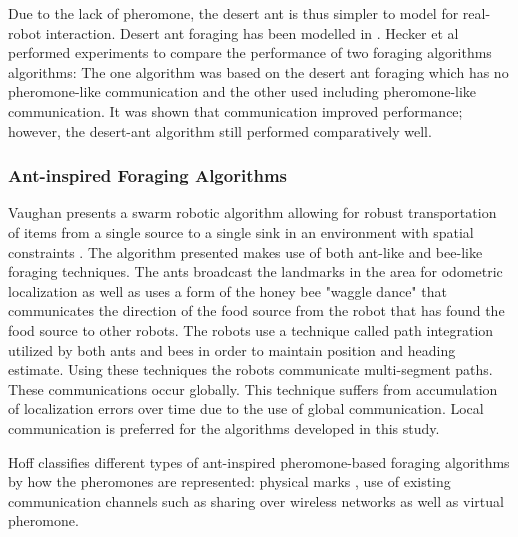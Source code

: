 Due to the lack of pheromone, the desert ant is thus simpler to model for real-robot interaction. Desert ant foraging has been modelled in \cite{moller1998modeling,hecker2012formica}. Hecker et al \cite{hecker2012formica} performed experiments to compare the performance of two foraging algorithms algorithms: The one algorithm was based on the desert ant foraging which has no pheromone-like communication and the other used including pheromone-like communication. It was shown that communication improved performance; however, the desert-ant algorithm still performed comparatively well. 

\subsubsection{Ant-inspired Foraging Algorithms}
\label{sec:second:natureinspired:ant}

Vaughan presents a swarm robotic algorithm allowing for robust transportation of items from a single source to a single sink in an environment with spatial constraints \cite{vaughan2000blazing}. The algorithm presented makes use of both ant-like and bee-like foraging techniques. The ants broadcast the landmarks in the area for odometric localization as well as uses a form of the  honey bee "waggle dance" that communicates the direction of the food source from the robot that has found the food source to other robots. The robots use a technique called path integration utilized by both ants and bees in order to maintain position and heading estimate. Using these techniques the robots communicate multi-segment paths. These communications occur globally. This technique suffers from accumulation of localization errors over time due to the use of global communication. Local communication is preferred for the algorithms developed in this study.   %


Hoff \cite{hoff2010two} classifies different types of ant-inspired pheromone-based foraging algorithms by how the pheromones are represented: physical marks \cite{alcoholfromants2012}, use of existing communication channels such as sharing over wireless networks as well as virtual pheromone. %

